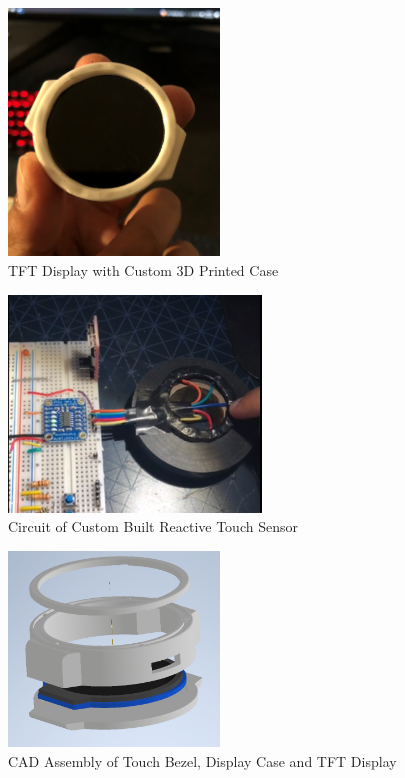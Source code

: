\documentclass[12pt, titlepage]{article}
\begin{document}
\begin{figure}[H]
	\begin{center}
		 \includegraphics[width=0.5\textwidth]{DisplayCase}
		\caption{TFT Display with Custom 3D Printed Case}
		\label{DisplayCase} 
	\end{center}
\end{figure}

\begin{figure}[H]
	\begin{center}
		 \includegraphics[width=0.6\textwidth]{TouchSensor}
		\caption{Circuit of Custom Built Reactive Touch Sensor}
		\label{TouchSensor} 
	\end{center}
\end{figure}

\begin{figure}[H]
	\begin{center}
		 \includegraphics[width=0.5\textwidth]{WatchCAD}
		\caption{CAD Assembly of Touch Bezel, Display Case and TFT Display}
		\label{WatchCAD} 
	\end{center}
\end{figure}
\end{document}
